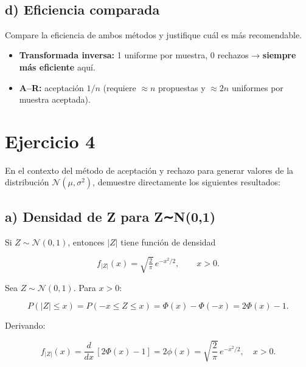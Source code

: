 \documentclass[10pt,a4paper]{article}
\let\le\leqslant
\let\leq\leqslant
\let\le\leq
\let\oldsection\section
\renewcommand{\section}{%
      \clearpage
      \thispagestyle{myfancy}%
      \oldsection
    }
\begin{document}
    \begin{center}
    \end{center}
    { \hspace*{\fill} \\}
    
    \hypertarget{d-eficiencia-comparada}{%
\subsection{d) Eficiencia comparada}\label{d-eficiencia-comparada}}

    Compare la eficiencia de ambos métodos y justifique cuál es más
recomendable.

    \begin{itemize}
\item
  \textbf{Transformada inversa:} 1 uniforme por muestra, 0 rechazos →
  \textbf{siempre más eficiente} aquí.
\item
  \textbf{A--R:} aceptación \(1/n\) (requiere \(\approx n\) propuestas y
  \(\approx 2n\) uniformes por muestra aceptada).
\end{itemize}

    \hypertarget{ejercicio-4}{%
\section{Ejercicio 4}\label{ejercicio-4}}

    En el contexto del método de aceptación y rechazo para generar valores
de la distribución \(\mathcal{N}(\mu, \sigma^{2})\), demuestre
directamente los siguientes resultados:

    \hypertarget{a-densidad-de-z-para-zn01}{%
\subsection{a) Densidad de \textbar Z\textbar{} para
Z∼N(0,1)}\label{a-densidad-de-z-para-zn01}}

    Si \(Z \sim \mathcal{N}(0,1)\), entonces \(|Z|\) tiene función de
densidad

\[
f_{|Z|}(x) = \sqrt{\tfrac{2}{\pi}}\, e^{-x^{2}/2}, \qquad x > 0.
\]

    Sea \(Z\sim\mathcal N(0,1)\). Para \(x>0\):

\[
P(|Z|\le x)=P(-x\le Z\le x)=\Phi(x)-\Phi(-x)=2\Phi(x)-1.
\]

Derivando:

\[
f_{|Z|}(x)=\frac{d}{dx}\,[2\Phi(x)-1]=2\phi(x)
=\boxed{\sqrt{\frac{2}{\pi}}\,e^{-x^{2}/2}},\quad x>0.
\]
\end{document}
